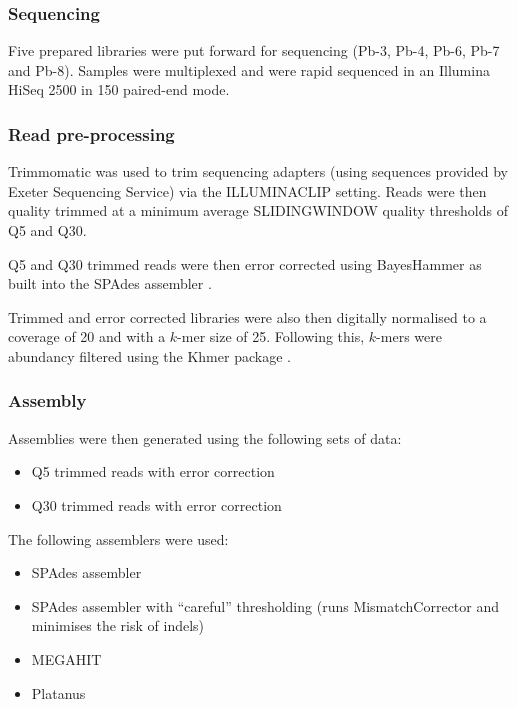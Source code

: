 \subsubsection{Sequencing}

Five prepared libraries were put forward for sequencing 
(Pb-3, Pb-4, Pb-6, Pb-7 and Pb-8).   Samples were
multiplexed and were rapid sequenced in an Illumina
HiSeq 2500 in \SI{150}{\bp} paired-end mode. 

\subsubsection{Read pre-processing}

Trimmomatic \citep{Bolger2014a} was used to trim sequencing adapters (using sequences
provided by Exeter Sequencing Service) via the ILLUMINACLIP setting.
Reads were then quality trimmed at a minimum average SLIDINGWINDOW 
quality thresholds of Q5 and Q30. 

Q5 and Q30 trimmed reads were then error corrected using BayesHammer
\citep{Nikolenko2013} as built into the SPAdes assembler \citep{Bankevich2012}.

Trimmed and error corrected libraries were also then digitally normalised
\citep{Brown2012} to a coverage of 20 and with a \(k\)-mer size of 25.
Following this, \(k\)-mers were abundancy filtered \citep{Zhang2014,Zhang2015}
using the Khmer package \citep{Crusoe2015}.

\subsubsection{Assembly}

Assemblies were then generated using the following sets
of data:

\begin{itemize}
    \item Q5 trimmed reads with error correction
    \item Q30 trimmed reads with error correction
\end{itemize}

The following assemblers were used:
\begin{itemize}
    \item SPAdes assembler \citep{Bankevich2012,Nurk2013}
    \item SPAdes assembler with ``careful'' thresholding (runs MismatchCorrector and minimises the risk 
        of indels)
    \item MEGAHIT \citep{Li2015a}
    \item Platanus \citep{Kajitani2014}
\end{itemize}

